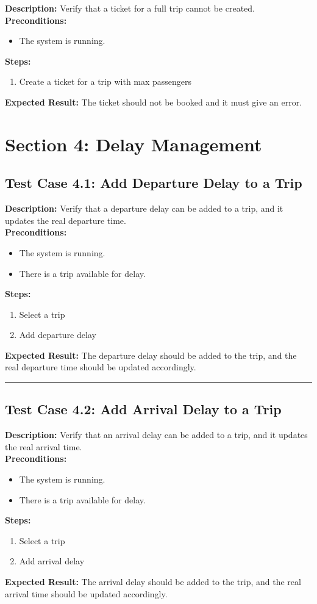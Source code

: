 \documentclass{article}
\begin{document}
\textbf{Description:} Verify that a ticket for a full trip cannot be created.\\
\textbf{Preconditions:}
\begin{itemize}
  \item The system is running.
\end{itemize}
\textbf{Steps:}
\begin{enumerate}
  \item Create a ticket for a trip with max passengers
\end{enumerate}
\textbf{Expected Result:} The ticket should not be booked and it must give an error.

\pagebreak

\section{Section 4: Delay Management}
\bigskip
\bigskip
\subsection{Test Case 4.1: Add Departure Delay to a Trip}

\textbf{Description:} Verify that a departure delay can be added to a trip, and it updates the real departure time.\\
\textbf{Preconditions:}
\begin{itemize}
  \item The system is running.
  \item There is a trip available for delay.
\end{itemize}
\textbf{Steps:}
\begin{enumerate}
  \item Select a trip
  \item Add departure delay
\end{enumerate}
\textbf{Expected Result:} The departure delay should be added to the trip, and the real departure time should be updated accordingly.

\bigskip
\hrule
\bigskip

\subsection{Test Case 4.2: Add Arrival Delay to a Trip}

\textbf{Description:} Verify that an arrival delay can be added to a trip, and it updates the real arrival time.\\
\textbf{Preconditions:}
\begin{itemize}
  \item The system is running.
  \item There is a trip available for delay.
\end{itemize}
\textbf{Steps:}
\begin{enumerate}
    \item Select a trip
    \item Add arrival delay
\end{enumerate}
\textbf{Expected Result:} The arrival delay should be added to the trip, and the real arrival time should be updated accordingly.
\end{document}
